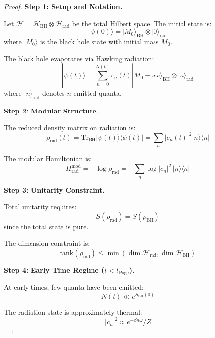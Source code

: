 \documentclass[12pt,a4paper]{article}
\begin{document}
\begin{proof}
\textbf{Step 1: Setup and Notation.}

Let $\mathcal{H} = \mathcal{H}_{\text{BH}} \otimes \mathcal{H}_{\text{rad}}$ be the total Hilbert space. The initial state is:
\begin{equation}
|\psi(0)\rangle = |M_0\rangle_{\text{BH}} \otimes |0\rangle_{\text{rad}}
\end{equation}
where $|M_0\rangle$ is the black hole state with initial mass $M_0$.

The black hole evaporates via Hawking radiation:
\begin{equation}
|\psi(t)\rangle = \sum_{n=0}^{N(t)} c_n(t) |M_0 - n\omega\rangle_{\text{BH}} \otimes |n\rangle_{\text{rad}}
\end{equation}
where $|n\rangle_{\text{rad}}$ denotes $n$ emitted quanta.

\textbf{Step 2: Modular Structure.}

The reduced density matrix on radiation is:
\begin{equation}
\rho_{\text{rad}}(t) = \text{Tr}_{\text{BH}} |\psi(t)\rangle\langle\psi(t)| = \sum_n |c_n(t)|^2 |n\rangle\langle n|
\end{equation}

The modular Hamiltonian is:
\begin{equation}
H_{\text{rad}}^{\text{mod}} = -\log \rho_{\text{rad}} = -\sum_n \log|c_n|^2 \, |n\rangle\langle n|
\end{equation}

\textbf{Step 3: Unitarity Constraint.}

Total unitarity requires:
\begin{equation}
S(\rho_{\text{rad}}) = S(\rho_{\text{BH}})
\end{equation}
since the total state is pure.

The dimension constraint is:
\begin{equation}
\text{rank}(\rho_{\text{rad}}) \leq \min\left( \dim\mathcal{H}_{\text{rad}}, \dim\mathcal{H}_{\text{BH}} \right)
\end{equation}

\textbf{Step 4: Early Time Regime ($t < t_{\text{Page}}$).}

At early times, few quanta have been emitted:
\begin{equation}
N(t) \ll e^{S_{\text{BH}}(0)}
\end{equation}

The radiation state is approximately thermal:
\begin{equation}
|c_n|^2 \approx e^{-\beta n\omega}/Z
\end{equation}


\end{proof}
\end{document}
